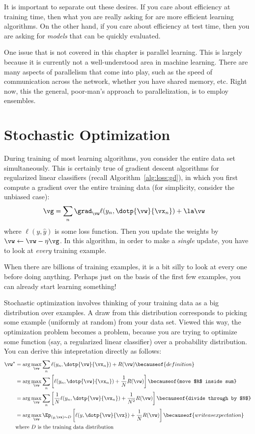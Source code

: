 It is important to separate out these desires.  If you care about
efficiency at training time, then what you are really asking for are
more efficient learning algorithms.  On the other hand, if you care
about efficiency at test time, then you are asking for \emph{models}
that can be quickly evaluated.

One issue that is not covered in this chapter is parallel learning.
This is largely because it is currently not a well-understood area in
machine learning.  There are many aspects of parallelism that come
into play, such as the speed of communication across the network,
whether you have shared memory, etc.  Right now, this the general,
poor-man's approach to parallelization, is to employ ensembles.

\section{Stochastic Optimization}

During training of most learning algorithms, you consider the entire
data set simultaneously.  This is certainly true of gradient descent
algorithms for regularized linear classifiers (recall
Algorithm~\ref{alg:loss:gd}), in which you first compute a gradient
over the entire training data (for simplicity, consider the unbiased
case):
%
\begin{align}
\vg
&= \sum_n \grad_{\vw} \ell(y_n, \dotp{\vw}{\vx_n}) + \la \vw
\end{align}
%
where $\ell(y,\hat y)$ is some loss function.  Then you update the
weights by $\vw \leftarrow \vw - \eta \vg$.  In this algorithm, in
order to make a \emph{single} update, you have to look at \emph{every}
training example.

When there are billions of training examples, it is a bit silly to
look at every one before doing anything.  Perhaps just on the basis of
the first few examples, you can already start learning something!

Stochastic optimization involves thinking of your training data as a
big distribution over examples.  A draw from this distribution
corresponds to picking some example (uniformly at random) from your
data set.  Viewed this way, the optimization problem becomes a
 problem, because you are trying to
optimize some function (say, a regularized linear classifier) over a
probability distribution.  You can derive this intepretation directly
as follows:
%
\begin{align}
\vw^*
&= \arg\max_{\vw} \sum_n \ell(y_n, \dotp{\vw}{\vx_n}) + R(\vw)
\becauseof{definition}\\
&= \arg\max_{\vw} \sum_n \left[ \ell(y_n, \dotp{\vw}{\vx_n}) + \frac 1 N R(\vw) \right]
\becauseof{move $R$ inside sum}\\
&= \arg\max_{\vw} \sum_n \left[ \frac 1 N \ell(y_n, \dotp{\vw}{\vx_n}) + \frac 1 {N^2} R(\vw) \right]
\becauseof{divide through by $N$}\\
&= \arg\max_{\vw} \Ep_{(y,\vx) \sim D} \left[ \ell(y, \dotp{\vw}{\vx}) + \frac 1 N R(\vw) \right]
\becauseof{write as expectation}\\
& \text{where } D \text{ is the training data distribution}
\end{align}
%

